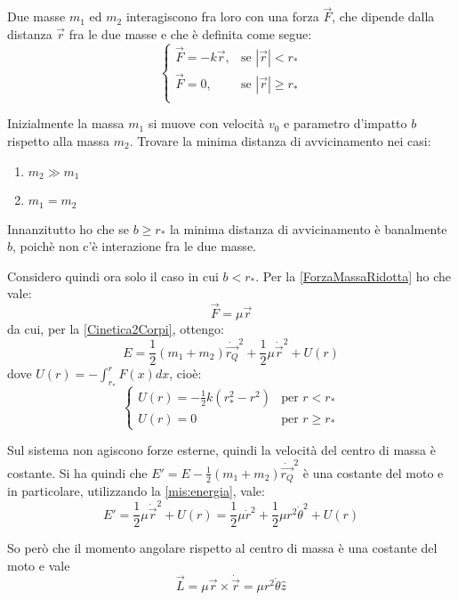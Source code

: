 \documentclass[../main.tex]{subfiles}
\begin{document}
\textex
Due masse $m_1$ ed $m_2$ interagiscono fra loro con una forza $\vec F$, che dipende dalla distanza $\vec r$ fra le due masse e che è definita come segue:
\begin{equation*}
\begin{cases}
	\vec F=-k\vec r, &\mbox{se } |\vec r|<r_*\\
	\vec F=0, & \mbox{se } |\vec r|\ge r_*\\
\end{cases}
\end{equation*}

Inizialmente la massa $m_1$ si muove con velocità $v_0$ e parametro d'impatto $b$ rispetto alla massa $m_2$.
Trovare la minima distanza di avvicinamento nei casi:
\begin{enumerate}
	\item $m_2\gg m_1$
	\item $m_1=m_2$
\end{enumerate}

\solution
Innanzitutto ho che se $b\ge r_*$ la minima distanza di avvicinamento è banalmente $b$, poichè non c'è interazione fra le due masse.

Considero quindi ora solo il caso in cui $b<r_*$. 
Per la \cref{ForzaMassaRidotta} ho che vale:
\begin{equation*}
	\vec F=\mu \vec r
\end{equation*}
da cui, per la \cref{Cinetica2Corpi}, ottengo:
\begin{equation}\label{mis:energia}
	E=\frac12(m_1+m_2)\dot{\overrightarrow{r_Q}}^2+\frac12\mu\dot{\vec{r}}^2+U(r)
\end{equation}
dove $U(r)=-\int_{r_*}^r F(x) dx$, cioè:
\begin{equation*}
	\begin{cases}
		U(r)=-\frac12k(r_*^2-r^2) &\mbox{per } r<r_*\\
		U(r)=0 &\mbox{per } r\ge r_*
	\end{cases}
\end{equation*}

Sul sistema non agiscono forze esterne, quindi la velocità del centro di massa è costante.
Si ha quindi che $E'=E-\frac12(m_1+m_2)\dot{\overrightarrow{r_Q}}^2$ è una costante del moto e in particolare, utilizzando la \cref{mis:energia}, vale:
\begin{equation*}
	E'=\frac12\mu\dot{\vec{r}}^2+U(r)=\frac12\mu\dot r^2+\frac12\mu r^2\dot \theta^2+U(r)
\end{equation*}

So però che il momento angolare rispetto al centro di massa è una costante del moto e vale 
\begin{equation*}
	\vec L=\mu \vec r \times \dot {\vec r}=\mu r^2\dot\theta \hat z
\end{equation*}
\end{document}
